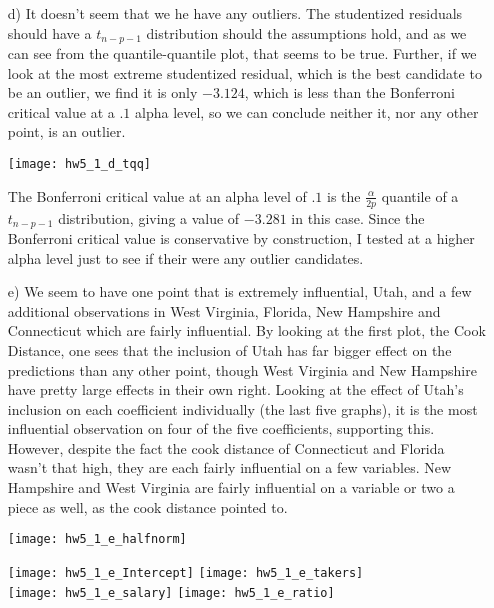 \documentclass[11pt]{article}
\theoremstyle{definition}
\begin{document}
\begin{itemize}
\begin{itemize}
            \item[d)]
                It doesn't seem that we he have any outliers. The studentized residuals should have a $t_{n-p-1}$ distribution should the assumptions hold, and as we can see from the quantile-quantile plot, that seems to be true. Further, if we look at the most extreme studentized residual, which is the best candidate to be an outlier, we find it is only $-3.124$, which is less than the Bonferroni critical value at a $.1$ alpha level, so we can conclude neither it, nor any other point, is an outlier. 
                \smallskip
                \begin{center}
                    \texttt{[image: hw5\_1\_d\_tqq]} 
                \end{center}
                The Bonferroni critical value at an alpha level of $.1$ is the \(\frac{\alpha}{2p}\) quantile of a $t_{n-p-1}$ distribution, giving a value of $-3.281$ in this case. Since the Bonferroni critical value is conservative by construction, I tested at a higher alpha level just to see if their were any outlier candidates.
            \item[e)]
                We seem to have one point that is extremely influential, Utah, and a few additional observations in West Virginia, Florida, New Hampshire and Connecticut which are fairly influential. By looking at the first plot, the Cook Distance, one sees that the inclusion of Utah has far bigger effect on the predictions than any other point, though West Virginia and New Hampshire have pretty large effects in their own right. Looking at the effect of Utah's inclusion on each coefficient individually (the last five graphs), it is the most influential observation on four of the five coefficients, supporting this. However, despite the fact the cook distance of Connecticut and Florida wasn't that high, they are each fairly influential on a few variables. New Hampshire and West Virginia are fairly influential on a variable or two a piece as well, as the cook distance pointed to.
                \begin{center}
                    \texttt{[image: hw5\_1\_e\_halfnorm]} 
                \end{center}
                \texttt{[image: hw5\_1\_e\_Intercept]}
                \texttt{[image: hw5\_1\_e\_takers]} \\
                \texttt{[image: hw5\_1\_e\_salary]} 
                \texttt{[image: hw5\_1\_e\_ratio]}  \\

\end{itemize}
\end{itemize}
\end{document}
